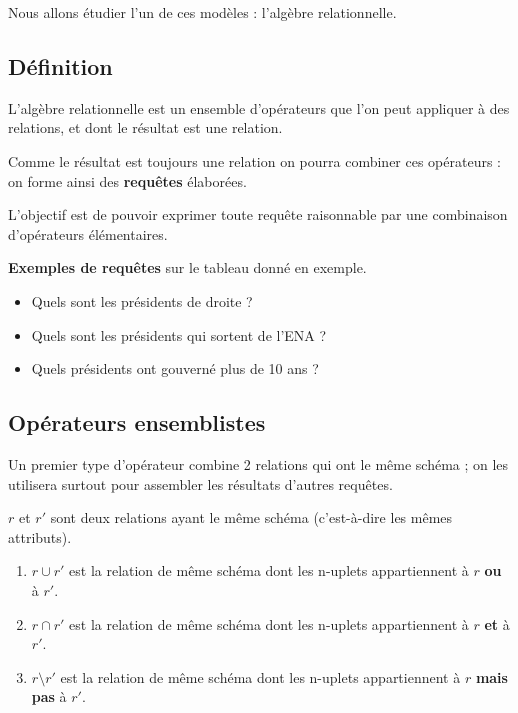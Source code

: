 Nous allons étudier l'un de ces modèles : l'algèbre relationnelle.
\subsection{Définition}
L'algèbre relationnelle est un ensemble d'opérateurs que l'on peut appliquer à des relations, et dont le résultat est une relation.

Comme le résultat est toujours une relation on pourra combiner ces opérateurs : on forme ainsi des {\bf requêtes} élaborées.

L'objectif est de pouvoir exprimer toute requête raisonnable par une combinaison d'opérateurs élémentaires.

{\bf Exemples de requêtes} sur le tableau donné en exemple.
\begin{itemize}
\item Quels sont les présidents de droite ?
\item Quels sont les présidents qui sortent de l'ENA ?
\item Quels présidents ont gouverné plus de 10 ans ?
\end{itemize}
\subsection{Opérateurs ensemblistes}
Un premier type d'opérateur combine 2 relations qui ont le même schéma ; on les utilisera surtout pour assembler les résultats d'autres requêtes.

$r$ et $r'$ sont deux relations ayant le même schéma (c'est-à-dire les mêmes attributs).
\begin{enumerate}
\item $r \cup r'$ est la relation de même schéma dont les n-uplets appartiennent à $r$ {\bf ou} à $r'$.
\item $r \cap r'$ est la relation de même schéma dont les n-uplets appartiennent à $r$ {\bf et} à $r'$.
\item $r \setminus r'$ est la relation de même schéma dont les n-uplets  appartiennent à $r$ {\bf mais pas} à $r'$.
\end{enumerate}
